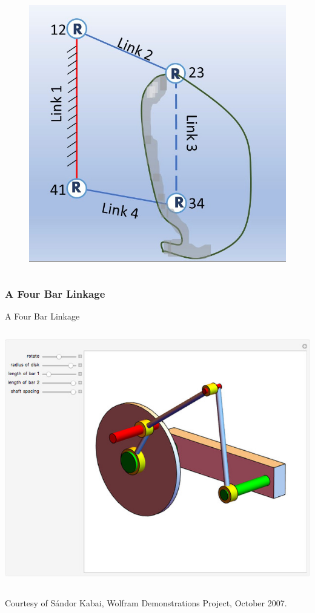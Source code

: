 \begin{frame}
\begin{tcolorbox}[colframe=blue!80!green, title=A (Hacked) Four-Bar Linkage, coltitle=white!80,toggle enlargement=none]
\begin{columns}[b]
\begin{column}{.45\linewidth}
\begin{figure}
			\includegraphics[width=\textwidth]{figures/4bardual.jpg}
			\end{figure}
		\end{column}	
		\end{columns}
	\end{tcolorbox}
	\label{fig:4bar}
\end{frame}

\begin{frame}
	\frametitle{A Four Bar Linkage}	
	\begin{block}{A Four Bar Linkage}
		\begin{columns}[]
			\begin{column}{\linewidth}		
				\centering 
				\href{https://demonstrations.wolfram.com/FourBarLinkage/}{
					\includegraphics[width=.6\textwidth]{figures/4bar_wolfram.jpg}
				}
			\end{column}	
		\end{columns}
		\footnotesize{Courtesy of S{\'a}ndor Kabai, Wolfram Demonstrations Project, October 2007.}
	\end{block}
	\label{fig:4bar_wolfram}
\end{frame}

